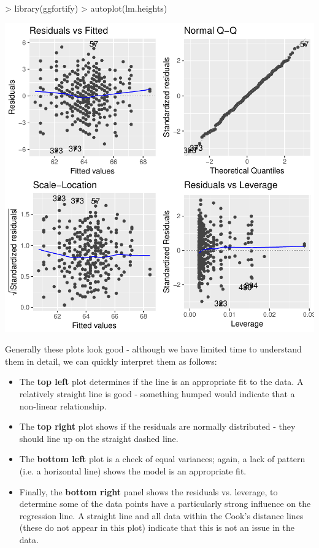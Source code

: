 \documentclass[a4paper,12pt]{article}
\begin{document}
\begin{shaded}
\begin{Schunk}
\begin{Sinput}
> library(ggfortify)
> autoplot(lm.heights)
\end{Sinput}
\end{Schunk}
\includegraphics{1_Stats_Course_Notes-knitr-020}
\end{shaded}

Generally these plots look good - although we have limited time to understand them in detail, we can quickly interpret them as follows:

\begin{itemize}
\item The \textbf{top left} plot determines if the line is an appropriate fit to the data. A relatively straight line is good - something humped would indicate that a non-linear relationship. 
\item The \textbf{top right} plot shows if the residuals are normally distributed - they should line up on the straight dashed line.
\item The \textbf{bottom left} plot is a check of equal variances; again, a lack of pattern (i.e. a horizontal line) shows the model is an appropriate fit.
\item Finally, the \textbf{bottom right} panel shows the residuals vs. leverage, to determine some of the data points have a particularly strong influence on the regression line. A straight line and all data within the Cook's distance lines (these do not appear in this plot) indicate that this is not an issue in the data.
\end{itemize}
\end{document}
